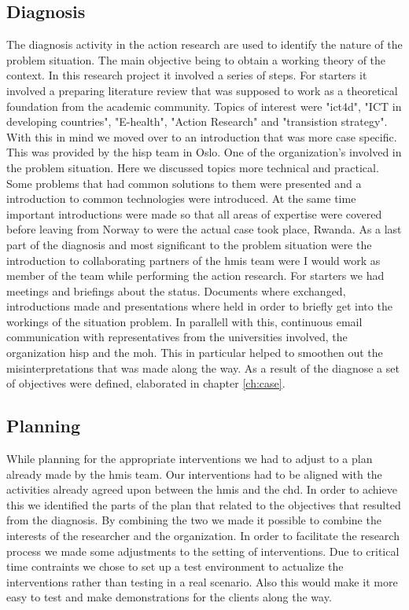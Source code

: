 \subsection{Diagnosis}
The diagnosis activity in the action research are used to identify the nature of the problem situation. 
The main objective being to obtain a working theory of the context.
In this research project it involved a series of steps.
For starters it involved a preparing literature review that was supposed to work as a theoretical foundation from the academic community.
Topics of interest were "ict4d", "ICT in developing countries", "E-health", "Action Research" and "transistion strategy".
With this in mind we moved over to an introduction that was more case specific.
This was provided by the \gls{hisp} team in Oslo. One of the organization's involved in the problem situation.
Here we discussed topics more technical and practical. 
Some problems that had common solutions to them were presented and a introduction to common technologies were introduced.
At the same time important introductions were made so that all areas of expertise were covered before leaving from Norway to were the actual case took place, Rwanda.
As a last part of the diagnosis and most significant to the problem situation were the introduction to collaborating partners of the \gls{hmis} team were I would work as member of the team while performing the action research.
For starters we had meetings and briefings about the status. Documents where exchanged, introductions made and presentations where held in order to briefly get into the workings of the situation problem.
In parallell with this, continuous email communication with representatives from the universities involved, the organization \gls{hisp} and the \gls{moh}. This in particular helped to smoothen out the misinterpretations that was made along the way. 
As a result of the diagnose a set of objectives were defined, elaborated in chapter \ref{ch:case}.
\subsection{Planning}
While planning for the appropriate interventions we had to adjust to a plan already made by the \gls{hmis} team.
Our interventions had to be aligned with the activities already agreed upon between the \gls{hmis} and the \gls{chd}.
In order to achieve this we identified the parts of the plan that related to the objectives that resulted from the diagnosis.
By combining the two we made it possible to combine the interests of the researcher and the organization. 
In order to facilitate the research process we made some adjustments to the setting of interventions. 
Due to critical time contraints we chose to set up a test environment to actualize the interventions rather than testing in a real scenario.
Also this would make it more easy to test and make demonstrations for the clients along the way.

